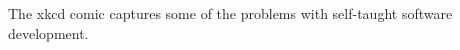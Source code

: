 \label{fig:xkcd}

The xkcd comic captures some of the problems with self-taught software development.
  
  